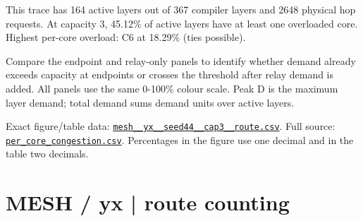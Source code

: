 \documentclass[10pt,a4paper]{article}
\begin{document}
This trace has 164 active layers out of 367 compiler layers and 2648 physical hop requests. At capacity 3, 45.12\% of active layers have at least one overloaded core. Highest per-core overload: C6 at 18.29\% (ties possible).\par
Compare the endpoint and relay-only panels to identify whether demand already exceeds capacity at endpoints or crosses the threshold after relay demand is added. All panels use the same 0-100\% colour scale. Peak D is the maximum layer demand; total demand sums demand units over active layers.\par
Exact figure/table data: \href{\detokenize{file:///home/dhruv-pansuriya/Documents/BTP/Compiler-Driven-ACE/output/pdf/qaoa_methods_congestion/tables/mesh__yx__seed44__cap3__route.csv}}{\nolinkurl{mesh__yx__seed44__cap3__route.csv}}. Full source: \href{\detokenize{file:///home/dhruv-pansuriya/Documents/BTP/Compiler-Driven-ACE/results/qaoa_2seed_2026-10-26/congestion/per_core_congestion.csv}}{\nolinkurl{per_core_congestion.csv}}. Percentages in the figure use one decimal and in the table two decimals.\par
\clearpage
\section*{MESH / yx | route counting}
\end{document}
